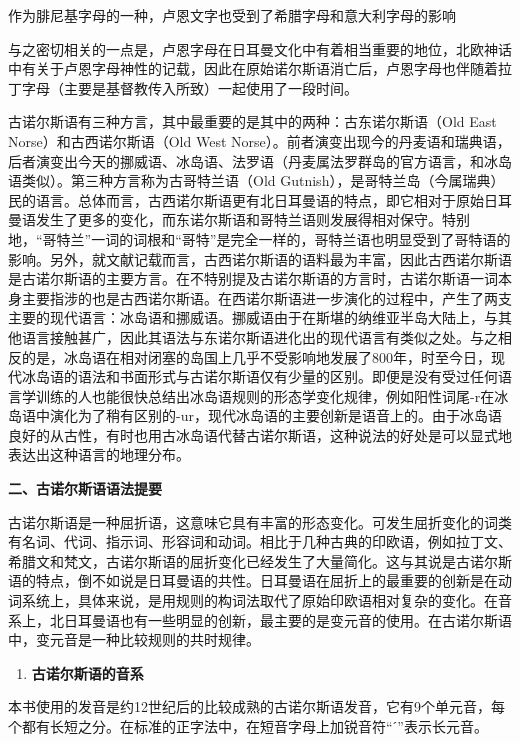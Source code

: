 作为腓尼基字母的一种，卢恩文字也受到了希腊字母和意大利字母的影响

与之密切相关的一点是，卢恩字母在日耳曼文化中有着相当重要的地位，北欧神话中有关于卢恩字母神性的记载，因此在原始诺尔斯语消亡后，卢恩字母也伴随着拉丁字母（主要是基督教传入所致）一起使用了一段时间。

古诺尔斯语有三种方言，其中最重要的是其中的两种：古东诺尔斯语（Old East
Norse）和古西诺尔斯语（Old West
Norse）。前者演变出现今的丹麦语和瑞典语，后者演变出今天的挪威语、冰岛语、法罗语（丹麦属法罗群岛的官方语言，和冰岛语类似）。第三种方言称为古哥特兰语（Old
Gutnish），是哥特兰岛（今属瑞典）民的语言。总体而言，古西诺尔斯语更有北日耳曼语的特点，即它相对于原始日耳曼语发生了更多的变化，而东诺尔斯语和哥特兰语则发展得相对保守。特别地，``哥特兰''一词的词根和``哥特''是完全一样的，哥特兰语也明显受到了哥特语的影响。另外，就文献记载而言，古西诺尔斯语的语料最为丰富，因此古西诺尔斯语是古诺尔斯语的主要方言。在不特别提及古诺尔斯语的方言时，古诺尔斯语一词本身主要指涉的也是古西诺尔斯语。在西诺尔斯语进一步演化的过程中，产生了两支主要的现代语言：冰岛语和挪威语。挪威语由于在斯堪的纳维亚半岛大陆上，与其他语言接触甚广，因此其语法与东诺尔斯语进化出的现代语言有类似之处。与之相反的是，冰岛语在相对闭塞的岛国上几乎不受影响地发展了800年，时至今日，现代冰岛语的语法和书面形式与古诺尔斯语仅有少量的区别。即便是没有受过任何语言学训练的人也能很快总结出冰岛语规则的形态学变化规律，例如阳性词尾-r在冰岛语中演化为了稍有区别的-ur，现代冰岛语的主要创新是语音上的。由于冰岛语良好的从古性，有时也用古冰岛语代替古诺尔斯语，这种说法的好处是可以显式地表达出这种语言的地理分布。

\textbf{二、古诺尔斯语语法提要}

古诺尔斯语是一种屈折语，这意味它具有丰富的形态变化。可发生屈折变化的词类有名词、代词、指示词、形容词和动词。相比于几种古典的印欧语，例如拉丁文、希腊文和梵文，古诺尔斯语的屈折变化已经发生了大量简化。这与其说是古诺尔斯语的特点，倒不如说是日耳曼语的共性。日耳曼语在屈折上的最重要的创新是在动词系统上，具体来说，是用规则的构词法取代了原始印欧语相对复杂的变化。在音系上，北日耳曼语也有一些明显的创新，最主要的是变元音的使用。在古诺尔斯语中，变元音是一种比较规则的共时规律。

\begin{enumerate}
  \def\labelenumi{\Alph{enumi}.}
  \item
        \textbf{古诺尔斯语的音系}
\end{enumerate}

本书使用的发音是约12世纪后的比较成熟的古诺尔斯语发音，它有9个单元音，每个都有长短之分。在标准的正字法中，在短音字母上加锐音符``ˊ''表示长元音。

